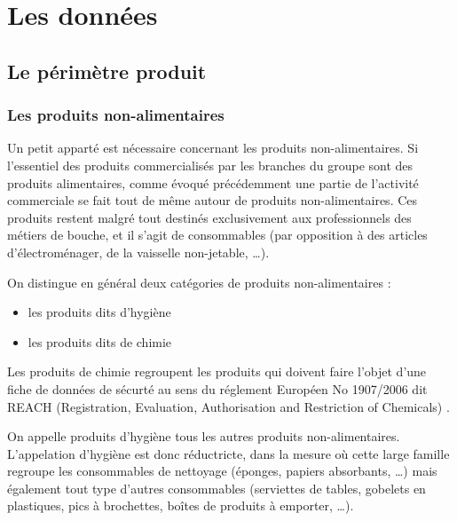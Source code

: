 \part{Les données}
    \chapter{Le périmètre produit}
    \label{perimetre_produit}

    \section{Les produits non-alimentaires}
    \label{produits_nonal}
    Un petit apparté est nécessaire concernant les produits non-alimentaires.
    Si l'essentiel des produits commercialisés par les branches du groupe sont des produits alimentaires, comme évoqué précédemment une partie de l'activité commerciale se fait tout de même autour de produits non-alimentaires.
    Ces produits restent malgré tout destinés exclusivement aux professionnels des métiers de bouche, et il s'agit de consommables (par opposition à des articles d'électroménager, de la vaisselle non-jetable, \dots).

    On distingue en général deux catégories de produits non-alimentaires : 
    \begin{itemize}
        \item les produits dits \og d'hygiène \fg
        \item les produits dits \og de chimie \fg
    \end{itemize}

    Les produits de chimie regroupent les produits qui doivent faire l'objet d'une fiche de données de sécurté au sens du réglement Européen No 1907/2006 dit \og REACH \fg (Registration, Evaluation, Authorisation and Restriction of Chemicals) \cite{reach_text}.

    On appelle produits d'hygiène tous les autres produits non-alimentaires.
    L'appelation \og d'hygiène \fg est donc réductricte, dans la mesure où cette large famille regroupe les consommables de nettoyage (éponges, papiers absorbants, \dots) mais également tout type d'autres consommables (serviettes de tables, gobelets en plastiques, pics à brochettes, boîtes de produits à emporter, \dots).


